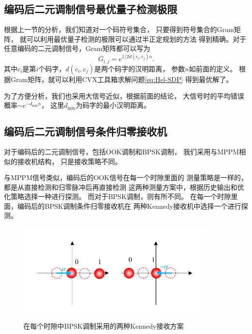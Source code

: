 \subsection{编码后二元调制信号最优量子检测极限}
根据上一节的分析，我们知道对一个码符号集合，
只要得到符号集合的Gram矩阵，
就可以利用最优量子检测的极限可以通过半正定规划的方法
得到精确。对于任意编码的二元调制信号，Gram矩阵都可以写为
\begin{equation}
G_{i,j} = e^{1/2 d(c_i, c_j) n}.
\end{equation}
其中$c_i$是第$i$个码字，$d(c_i, c_j)$是两个码字的汉明距离，
参数$n$如前面的定义。
根据Gram矩阵，就可以利用CVX工具箱\cite{cvx,gb08}求解问题\ref{eq:Hel-SDP}
得到最优解了。

为了方便分析，我们也采用大信号近似，根据前面的结论，
大信号时的平均错误概率$\sim e^{-d_{\min} n}$，
这里$d_{\min}$为码字的最小汉明距离。





\subsection{编码后二元调制信号条件归零接收机}
对于编码后的二元调制信号，包括OOK调制和BPSK调制，
我们采用与MPPM相似的接收机结构，
只是接收策略不同。

与MPPM信号类似，编码后的OOK信号在每一个时隙里面的
测量策略是一样的，都是从直接检测和归零脉冲后再直接检测
这两种测量方案中，根据历史输出和优化策略选择一种进行探测。
而对于BPSK调制，则有所不同。
在每一个时隙里面，编码后的BPSK调制条件归零接收机在
两种Kennedy接收机中选择一个进行探测。


\begin{figure}
\centering
  \includegraphics[height=5cm]{figures/chap4/BSPK-AB-receiver}
  \caption{在每个时隙中BPSK调制采用的两种Kennedy接收方案}
  \label{fig:BSPK-AB-receiver}
\end{figure}





